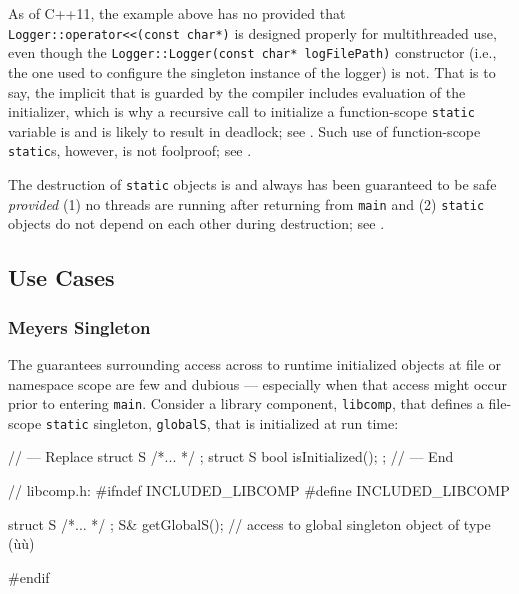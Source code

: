 \noindent As of C++11, the example above has no  provided that \linebreak%
\lstinline!Logger::operator<<(const!~\lstinline!char*)! is designed properly
for multithreaded use, even though the
\lstinline!Logger::Logger(const!~\lstinline!char*!~\lstinline!logFilePath)!
constructor (i.e., the one used to configure the singleton instance of
the logger) is not. That is to say, the implicit 
that is guarded by the compiler includes evaluation of the
initializer, which is why a recursive call to initialize a
function-scope \lstinline!static! variable is  and is
likely to result in deadlock; see .
Such use of function-scope \lstinline!static!s, however, is not foolproof;
see .

The destruction of  \lstinline!static! objects is
and always has been guaranteed to be safe \emph{provided} (1) no threads
are running after returning from \lstinline!main! and (2)
 \lstinline!static! objects do not depend on each
other during destruction; see .

\subsection[Use Cases]{Use Cases}\label{use-cases-functionstatic}

\subsubsection[Meyers Singleton]{Meyers Singleton}\label{meyers-singleton}

The guarantees surrounding access across  to runtime
initialized objects at file or namespace scope are few and dubious ---
especially when that access might occur prior to entering \lstinline!main!.
Consider a library component, \lstinline!libcomp!, that defines a
file-scope \lstinline!static! singleton, \lstinline!globalS!, that is
initialized at run time:

\begin{emcppshiddenlisting}[emcppsbatch=e7]
// --- Replace
struct S { /*... */ };
struct S {
  bool isInitialized();
};
// --- End
\end{emcppshiddenlisting}
\begin{emcppslisting}[emcppsbatch=e7]
// libcomp.h:
#ifndef INCLUDED_LIBCOMP
#define INCLUDED_LIBCOMP

struct S { /*... */ };
S& getGlobalS();  // access to global singleton object of type (ù{}ù)

#endif
\end{emcppslisting}


